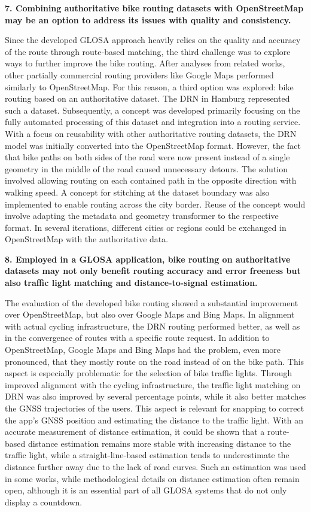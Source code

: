 \textbf{\color{cidarkblue}7. Combining authoritative bike routing datasets with OpenStreetMap may be an option to address its issues with quality and consistency.}

Since the developed GLOSA approach heavily relies on the quality and accuracy of the route through route-based matching, the third challenge was to explore ways to further improve the bike routing. After analyses from related works, other partially commercial routing providers like Google Maps performed similarly to OpenStreetMap. For this reason, a third option was explored: bike routing based on an authoritative dataset. The DRN in Hamburg represented such a dataset. Subsequently, a concept was developed primarily focusing on the fully automated processing of this dataset and integration into a routing service. With a focus on reusability with other authoritative routing datasets, the DRN model was initially converted into the OpenStreetMap format. However, the fact that bike paths on both sides of the road were now present instead of a single geometry in the middle of the road caused unnecessary detours. The solution involved allowing routing on each contained path in the opposite direction with walking speed. A concept for stitching at the dataset boundary was also implemented to enable routing across the city border. Reuse of the concept would involve adapting the metadata and geometry transformer to the respective format. In several iterations, different cities or regions could be exchanged in OpenStreetMap with the authoritative data.

\textbf{\color{cidarkblue}8. Employed in a GLOSA application, bike routing on authoritative datasets may not only benefit routing accuracy and error freeness but also traffic light matching and distance-to-signal estimation.} 

The evaluation of the developed bike routing showed a substantial improvement over OpenStreetMap, but also over Google Maps and Bing Maps. In alignment with actual cycling infrastructure, the DRN routing performed better, as well as in the convergence of routes with a specific route request. In addition to OpenStreetMap, Google Maps and Bing Maps had the problem, even more pronounced, that they mostly route on the road instead of on the bike path. This aspect is especially problematic for the selection of bike traffic lights. Through improved alignment with the cycling infrastructure, the traffic light matching on DRN was also improved by several percentage points, while it also better matches the GNSS trajectories of the users. This aspect is relevant for snapping to correct the app's GNSS position and estimating the distance to the traffic light. With an accurate measurement of distance estimation, it could be shown that a route-based distance estimation remains more stable with increasing distance to the traffic light, while a straight-line-based estimation tends to underestimate the distance further away due to the lack of road curves. Such an estimation was used in some works, while methodological details on distance estimation often remain open, although it is an essential part of all GLOSA systems that do not only display a countdown.

